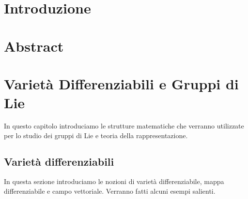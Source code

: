 \documentclass[12pt,a4paper]{report}
\theoremstyle{definition}
\theoremstyle{definition}
\theoremstyle{definition}
\theoremstyle{remark}
\begin{document}
	\chapter*{Introduzione}
	\chapter*{Abstract}
\chapter{Varietà Differenziabili e Gruppi di Lie}
In questo capitolo introduciamo le strutture matematiche che verranno utilizzate per lo studio dei gruppi di Lie e teoria della rappresentazione.
\section{Varietà differenziabili}
In questa sezione introduciamo le nozioni di varietà differenziabile, mappa differenziabile e campo vettoriale. Verranno fatti alcuni esempi salienti. 
\end{document}
